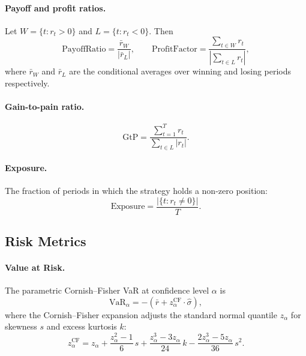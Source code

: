 \documentclass[11pt,a4paper]{article}
\begin{document}
\paragraph{Payoff and profit ratios.}
Let $W = \{t : r_t > 0\}$ and $L = \{t : r_t < 0\}$.  Then
\begin{equation}
  \text{PayoffRatio} = \frac{\bar{r}_W}{|\bar{r}_L|}, \qquad
  \text{ProfitFactor} = \frac{\sum_{t \in W} r_t}{\left|\sum_{t \in L} r_t\right|},
\end{equation}
where $\bar{r}_W$ and $\bar{r}_L$ are the conditional averages over winning and
losing periods respectively.

\paragraph{Gain-to-pain ratio.}
\begin{equation}
  \text{GtP} = \frac{\sum_{t=1}^{T} r_t}{\sum_{t \in L} |r_t|}.
\end{equation}

\paragraph{Exposure.}
The fraction of periods in which the strategy holds a non-zero position:
\begin{equation}
  \text{Exposure} = \frac{|\{t : r_t \neq 0\}|}{T}.
\end{equation}

\subsection{Risk Metrics}

\paragraph{Value at Risk.}
The parametric Cornish–Fisher VaR at confidence level $\alpha$ is
\begin{equation}
  \mathrm{VaR}_\alpha = -\left(\bar{r} + z_\alpha^{\mathrm{CF}} \cdot \hat\sigma\right),
\end{equation}
where the Cornish–Fisher expansion \citep{cornish1960} adjusts the standard
normal quantile $z_\alpha$ for skewness $s$ and excess kurtosis $k$:
\begin{equation}
  z_\alpha^{\mathrm{CF}} = z_\alpha
    + \frac{z_\alpha^2 - 1}{6}\,s
    + \frac{z_\alpha^3 - 3z_\alpha}{24}\,k
    - \frac{2z_\alpha^3 - 5z_\alpha}{36}\,s^2.
\end{equation}
\end{document}
